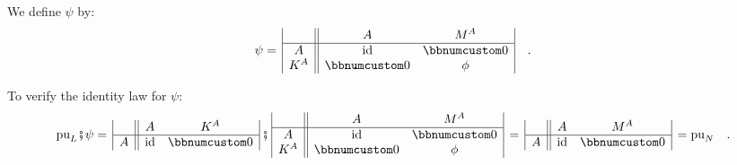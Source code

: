 We define $\psi$ by:
\[
\psi=\,\begin{array}{|c||cc|}
 & A & M^{A}\\
\hline A & \text{id} & \bbnum 0\\
K^{A} & \bbnum 0 & \phi
\end{array}\quad.
\]

To verify the identity law for $\psi$:
\[
\text{pu}_{L}\bef\psi=\,\begin{array}{|c||cc|}
 & A & K^{A}\\
\hline A & \text{id} & \bbnum 0
\end{array}\,\bef\,\begin{array}{|c||cc|}
 & A & M^{A}\\
\hline A & \text{id} & \bbnum 0\\
K^{A} & \bbnum 0 & \phi
\end{array}\,=\,\begin{array}{|c||cc|}
 & A & M^{A}\\
\hline A & \text{id} & \bbnum 0
\end{array}\,=\text{pu}_{N}\quad.
\]

